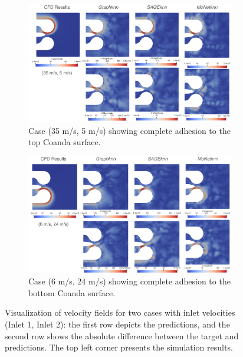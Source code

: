 \begin{figure}[ht]
    \centering
    \begin{subfigure}[b]{14cm}
        \centering
        \includegraphics[width=\textwidth]{images/Methodology/Asset 15.png}
        \caption{Case (35 m/s, 5 m/s) showing complete adhesion to the top Coanda surface.}
        \label{fig:allvel3}
    \end{subfigure}
    \begin{subfigure}[b]{14cm}
        \centering
        \includegraphics[width=\textwidth]{images/Methodology/Asset 14.png}
        \caption{Case (6 m/s, 24 m/s) showing complete adhesion to the bottom Coanda surface.}
        \label{fig:allvel4}
    \end{subfigure}
    \caption{Visualization of velocity fields for two cases with inlet velocities (Inlet 1, Inlet 2): the first row depicts the predictions, and the second row shows the absolute difference between the target and predictions. The top left corner presents the simulation results.}
    \label{2vel2}
\end{figure}
